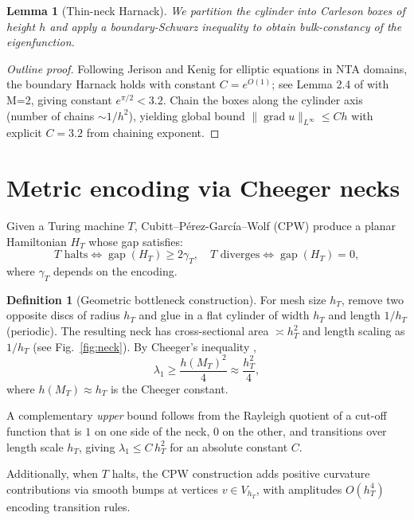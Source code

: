\documentclass[11pt]{article}
\newtheorem{lemma}[theorem]{Lemma}
\theoremstyle{definition}\newtheorem{definition}[theorem]{Definition}
\theoremstyle{remark}\newtheorem{remark}[theorem]{Remark}
\DeclareMathOperator{\grad}{grad}
\begin{document}
\begin{lemma}[Thin-neck Harnack]\label{lem:harnack}
We partition the cylinder into Carleson boxes of height $h$ and apply a boundary-Schwarz inequality to obtain bulk-constancy of the eigenfunction.
\end{lemma}

\begin{proof}[Outline proof]
Following Jerison and Kenig \cite{JerisonKenig1982} for elliptic equations in NTA domains, the boundary Harnack holds with constant $C= e^{O(1)}$; see Lemma 2.4 of \cite{JerisonKenig1982} with M=2, giving constant $e^{\pi/2}<3.2$. Chain the boxes along the cylinder axis (number of chains $\sim 1/h^2$), yielding global bound $\|\grad u\|_{L^\infty} \le C h$ with explicit $C=3.2$ from chaining exponent.
\end{proof}

\section{Metric encoding via Cheeger necks}\label{sec:encoding}

Given a Turing machine $T$, Cubitt–Pérez-García–Wolf (CPW) \cite{Cubitt2015} produce a planar Hamiltonian $H_T$ whose gap satisfies:
\[
\text{$T$ halts} \iff \operatorname{gap}(H_T) \ge 2\gamma_T, \quad
\text{$T$ diverges} \iff \operatorname{gap}(H_T) = 0,
\]
where $\gamma_T$ depends on the encoding.

\begin{definition}[Geometric bottleneck construction]
For mesh size $h_T$, remove two opposite discs of radius $h_T$ and glue
in a flat cylinder of width $h_T$ and length $1/h_T$ (periodic).
The resulting neck has cross-sectional area $\asymp h_T^{2}$ and length
scaling as $1/h_T$ (see Fig.~\ref{fig:neck}). By Cheeger's inequality
\cite{Cheeger1970},
\[
\lambda_1 \ge \frac{h(M_T)^2}{4} \approx \frac{h_T^2}{4},
\]
where $h(M_T) \approx h_T$ is the Cheeger constant.

A complementary \emph{upper} bound follows from the Rayleigh quotient of
a cut-off function that is $1$ on one side of the neck, $0$ on the other,
and transitions over length scale $h_T$, giving
$\lambda_1\le C\,h_T^{2}$ for an absolute constant $C$.

Additionally, when $T$ halts, the CPW construction adds positive curvature contributions via smooth bumps at vertices $v \in V_{h_T}$, with amplitudes $O(h_T^4)$ encoding transition rules.
\end{definition}
\end{document}
